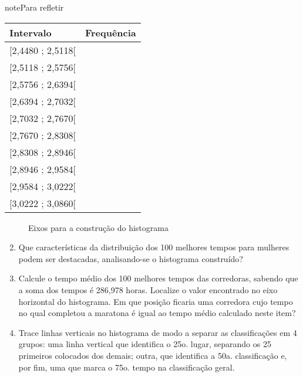 \begin{sphinxadmonition}{note}{Para refletir}
\begin{enumerate}
\end{enumerate}


\begin{savenotes}\sphinxattablestart
\centering
{}
\label{\detokenize{PE104-0:id14}}
\sphinxaftercaption
\begin{tabulary}{\linewidth}[t]{|T|T|}
\hline

Intervalo
&
Frequência
\\
\hline
{[}2,4480 ; 2,5118{[}
&\\
\hline
{[}2,5118 ; 2,5756{[}
&\\
\hline
{[}2,5756 ; 2,6394{[}
&\\
\hline
{[}2,6394 ; 2,7032{[}
&\\
\hline
{[}2,7032 ; 2,7670{[}
&\\
\hline
{[}2,7670 ; 2,8308{[}
&\\
\hline
{[}2,8308 ; 2,8946{[}
&\\
\hline
{[}2,8946 ; 2,9584{[}
&\\
\hline
{[}2,9584 ; 3,0222{[}
&\\
\hline
{[}3,0222 ; 3,0860{[}
&\\
\hline
\end{tabulary}
\par
\sphinxattableend\end{savenotes}

\begin{figure}[H]
\centering
\capstart

\noindent{}
\caption{Eixos para a construção do histograma}\label{\detokenize{PE104-0:hist-maratona-mulheres}}\label{\detokenize{PE104-0:id15}}\end{figure}
\begin{enumerate}
\setcounter{enumi}{1}
\item {} 
Que características da distribuição dos 100 melhores tempos para mulheres podem ser destacadas, analisando-se o histograma construído?

\item {} 
Calcule o tempo médio dos 100 melhores tempos das corredoras, sabendo que a soma dos tempos é 286,978 horas. Localize o valor encontrado no eixo horizontal do histograma. Em que posição ficaria uma corredora cujo tempo no qual completou a maratona é igual ao tempo médio calculado neste item?

\item {} 
Trace linhas verticais no histograma de modo a separar as classificações em 4 grupos: uma linha vertical que identifica o 25o. lugar, separando os 25 primeiros colocados dos demais; outra, que identifica a 50a. classificação e, por fim, uma que marca o 75o. tempo na classificação geral.


\end{enumerate}
\end{sphinxadmonition}
